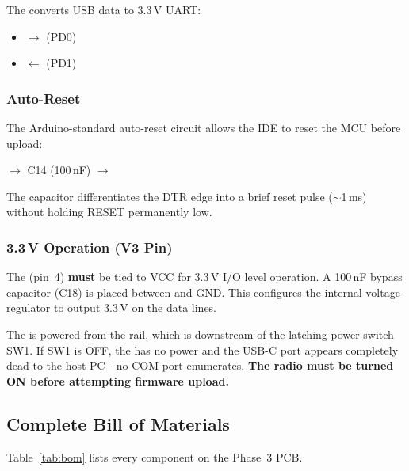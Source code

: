 The  converts USB data to 3.3\,V UART:
%
\begin{itemize}[leftmargin=1.8em, itemsep=2pt]
  \item {}  $\to$   (PD0)
  \item {}  $\leftarrow$   (PD1)
\end{itemize}

\subsubsection{Auto-Reset}

The Arduino-standard auto-reset circuit allows the IDE to reset the MCU before
upload:
%
\begin{center}
\small
{}  $\to$ C14 (100\,nF) $\to$ 
\end{center}
%
The capacitor differentiates the DTR edge into a brief reset pulse ($\sim$1\,ms)
without holding RESET permanently low.

\subsubsection{3.3\,V Operation (V3 Pin)}

The   (pin~4) \textbf{must} be tied to VCC for 3.3\,V I/O
level operation.  A 100\,nF bypass capacitor (C18) is placed between 
and GND.  This configures the internal voltage regulator to output 3.3\,V on
the data lines.

\begin{calloutwarn}
The  is powered from the  rail, which is downstream
of the latching power switch SW1.  If SW1 is OFF, the  has no
power and the USB-C port appears completely dead to the host PC - no COM port
enumerates.  \textbf{The radio must be turned ON before attempting firmware
upload.}
\end{calloutwarn}

\subsection{Complete Bill of Materials}

Table~\ref{tab:bom} lists every component on the Phase~3 PCB.

